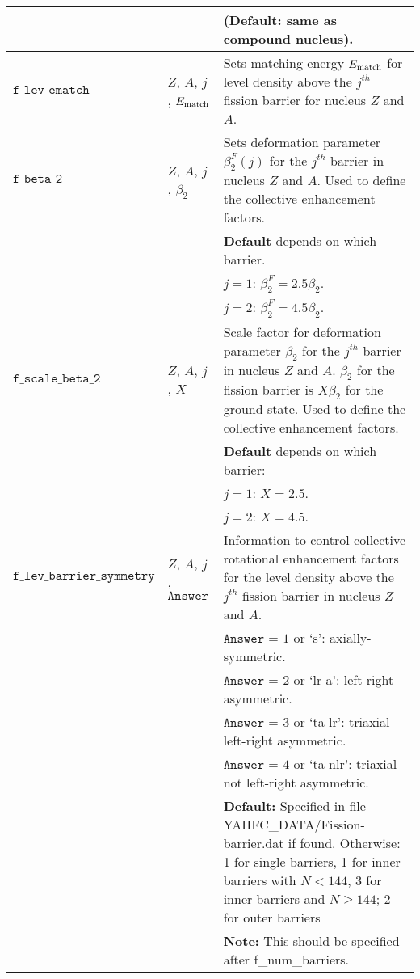 \documentclass[
10pt,
showpacs,preprintnumbers,footinbib,
amsfonts,amsmath,amssymb,
aps,
prc,twocolumn,groupedaddress,superscriptaddress,
showkeys,
nofootinbib
]{revtex4-1}
\begin{document}
\begin{center}
\begin{tabular}{| p{4cm} | p{4cm} | p{9cm} |}
& & ({\bf Default:} same as compound nucleus).\\
\hline
${\texttt{f\_lev\_ematch}}$  &  $Z$, $A$, $j$, $E_{\rm match}$ &    Sets matching energy $E_{\rm match}$ for level density above the $j^{th}$ fission barrier for nucleus $Z$ and $A$.\\
\hline
${\texttt{f\_beta\_2}}$ & $Z$, $A$, $j$, $\beta_2$ & Sets deformation parameter $\beta_2^F(j)$ for the $j^{th}$ barrier in nucleus $Z$ and $A$. Used to define the collective enhancement factors.\\
& & {\bf Default} depends on which barrier. \\
& & $j = 1$:  $\beta_2^F = 2.5\beta_2$.\\
& & $j = 2$:  $\beta_2^F = 4.5\beta_2$.\\
\hline
${\texttt{f\_scale\_beta\_2}}$ & $Z$, $A$, $j$, $X$ & Scale factor for deformation parameter $\beta_2$ for the $j^{th}$ barrier in nucleus $Z$ and $A$. $\beta_2$ for the fission barrier is $X\beta_2$ for the ground state. Used to define the collective enhancement factors.\\
& & {\bf Default} depends on which barrier: \\
& & $j = 1$:  $X = 2.5$.\\
& & $j = 2$:  $X = 4.5$.\\
\hline
${\texttt{f\_lev\_barrier\_symmetry}}$   &  $Z$, $A$, $j$, ${\texttt{Answer}}$ & Information to control collective rotational enhancement factors for the level density above the $j^{th}$ fission barrier in nucleus $Z$ and $A$.\\
& & ${\texttt{Answer}}$  = $1$ or `s': axially-symmetric.\\
& & ${\texttt{Answer}}$  = $2$ or `lr-a': left-right asymmetric.\\
& & ${\texttt{Answer}}$  = $3$ or `ta-lr': triaxial left-right asymmetric.\\
& & ${\texttt{Answer}}$  = $4$ or `ta-nlr': triaxial not left-right asymmetric.\\
& & {\bf Default:} Specified in file YAHFC\_DATA/Fission-barrier.dat if found. Otherwise: 1 for single barriers, 1 for inner barriers with $N < 144$, 3 for inner barriers and $N \ge 144$; 2 for outer barriers\\
& & {\bf Note:} This should be specified after f\_num\_barriers.\\
\hline
\end{tabular}
\end{center}
%
%
\end{document}
